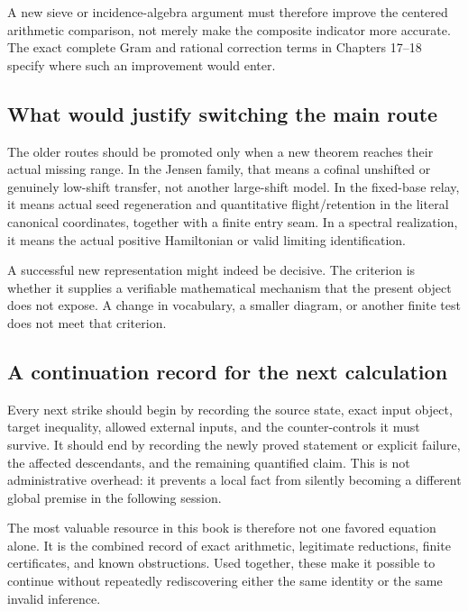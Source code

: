 \documentclass[
  10pt,
  a4paper,
  10pt,
  oneside,
  openany]{book}
\begin{document}
A new sieve or incidence-algebra argument must therefore improve the
centered arithmetic comparison, not merely make the composite indicator
more accurate. The exact complete Gram and rational correction terms in
Chapters 17--18 specify where such an improvement would enter.

\subsection{What would justify switching the main
route}\label{what-would-justify-switching-the-main-route}

The older routes should be promoted only when a new theorem reaches
their actual missing range. In the Jensen family, that means a cofinal
unshifted or genuinely low-shift transfer, not another large-shift
model. In the fixed-base relay, it means actual seed regeneration and
quantitative flight/retention in the literal canonical coordinates,
together with a finite entry seam. In a spectral realization, it means
the actual positive Hamiltonian or valid limiting identification.

A successful new representation might indeed be decisive. The criterion
is whether it supplies a verifiable mathematical mechanism that the
present object does not expose. A change in vocabulary, a smaller
diagram, or another finite test does not meet that criterion.

\subsection{A continuation record for the next
calculation}\label{a-continuation-record-for-the-next-calculation}

Every next strike should begin by recording the source state, exact
input object, target inequality, allowed external inputs, and the
counter-controls it must survive. It should end by recording the newly
proved statement or explicit failure, the affected descendants, and the
remaining quantified claim. This is not administrative overhead: it
prevents a local fact from silently becoming a different global premise
in the following session.

The most valuable resource in this book is therefore not one favored
equation alone. It is the combined record of exact arithmetic,
legitimate reductions, finite certificates, and known obstructions. Used
together, these make it possible to continue without repeatedly
rediscovering either the same identity or the same invalid inference.
\end{document}
